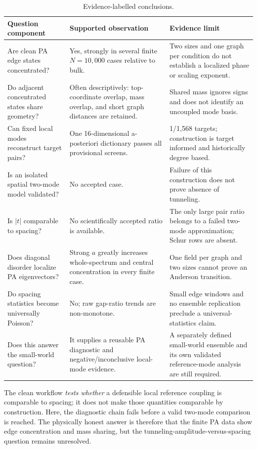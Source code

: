 \documentclass[11pt]{article}
\begin{document}
\begin{table}[H]
\centering
\small
\begin{tabularx}{\textwidth}{@{}Y Y Y@{}}
\toprule
Question component & Supported observation & Evidence limit \\
\midrule
Are clean PA edge states concentrated? & Yes, strongly in several finite \(N=10{,}000\) cases relative to bulk. & Two sizes and one graph per condition do not establish a localized phase or scaling exponent. \\
Do adjacent concentrated states share geometry? & Often descriptively: top-coordinate overlap, mass overlap, and short graph distances are retained. & Shared mass ignores signs and does not identify an uncoupled mode basis. \\
Can fixed local modes reconstruct target pairs? & One 16-dimensional a-posteriori dictionary passes all provisional screens. & 1/1,568 targets; construction is target informed and historically degree based. \\
Is an isolated spatial two-mode model validated? & No accepted case. & Failure of this construction does not prove absence of tunneling. \\
Is \(|t|\) comparable to spacing? & No scientifically accepted ratio is available. & The only large pair ratio belongs to a failed two-mode approximation; Schur rows are absent. \\
Does diagonal disorder localize PA eigenvectors? & Strong \(a\) greatly increases whole-spectrum and central concentration in every finite case. & One field per graph and two sizes cannot prove an Anderson transition. \\
Do spacing statistics become universally Poisson? & No; raw gap-ratio trends are non-monotone. & Small edge windows and no ensemble replication preclude a universal-statistics claim. \\
Does this answer the small-world question? & It supplies a reusable PA diagnostic and negative/inconclusive local-mode evidence. & A separately defined small-world ensemble and its own validated reference-mode analysis are still required. \\
\bottomrule
\end{tabularx}
\caption{Evidence-labelled conclusions.}
\label{tab:cook-answer}
\end{table}

The clean workflow \emph{tests whether} a defensible local reference coupling is comparable to spacing; it does not make those quantities comparable by construction.  Here, the diagnostic chain fails before a valid two-mode comparison is reached.  The physically honest answer is therefore that the finite PA data show edge concentration and mass sharing, but the tunneling-amplitude-versus-spacing question remains unresolved.
\end{document}
